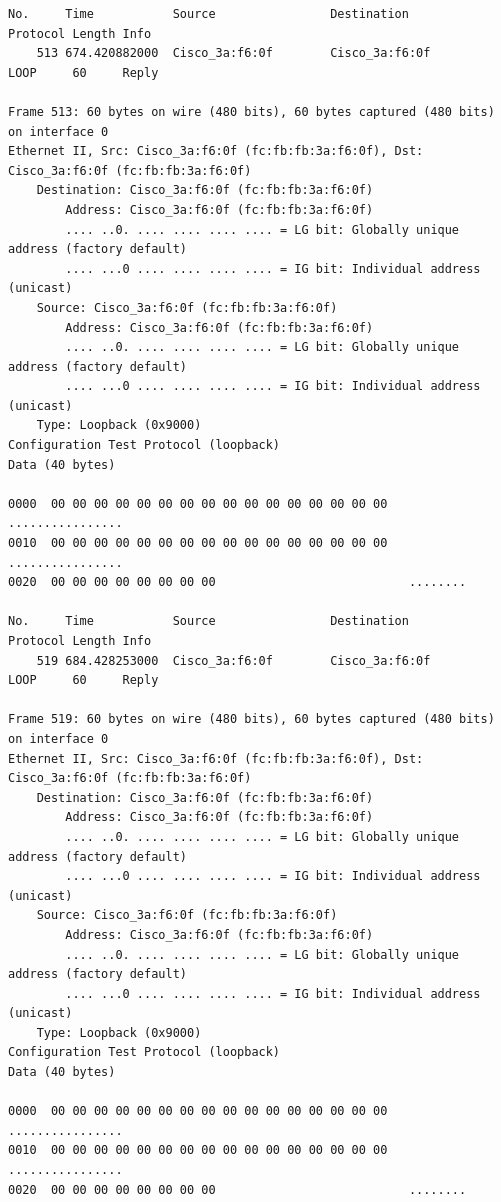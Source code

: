 \documentclass[a4paper,11pt]{article}
\begin{document}
\begin{lstlisting}
No.     Time           Source                Destination           Protocol Length Info
    513 674.420882000  Cisco_3a:f6:0f        Cisco_3a:f6:0f        LOOP     60     Reply

Frame 513: 60 bytes on wire (480 bits), 60 bytes captured (480 bits) on interface 0
Ethernet II, Src: Cisco_3a:f6:0f (fc:fb:fb:3a:f6:0f), Dst: Cisco_3a:f6:0f (fc:fb:fb:3a:f6:0f)
    Destination: Cisco_3a:f6:0f (fc:fb:fb:3a:f6:0f)
        Address: Cisco_3a:f6:0f (fc:fb:fb:3a:f6:0f)
        .... ..0. .... .... .... .... = LG bit: Globally unique address (factory default)
        .... ...0 .... .... .... .... = IG bit: Individual address (unicast)
    Source: Cisco_3a:f6:0f (fc:fb:fb:3a:f6:0f)
        Address: Cisco_3a:f6:0f (fc:fb:fb:3a:f6:0f)
        .... ..0. .... .... .... .... = LG bit: Globally unique address (factory default)
        .... ...0 .... .... .... .... = IG bit: Individual address (unicast)
    Type: Loopback (0x9000)
Configuration Test Protocol (loopback)
Data (40 bytes)

0000  00 00 00 00 00 00 00 00 00 00 00 00 00 00 00 00   ................
0010  00 00 00 00 00 00 00 00 00 00 00 00 00 00 00 00   ................
0020  00 00 00 00 00 00 00 00                           ........

No.     Time           Source                Destination           Protocol Length Info
    519 684.428253000  Cisco_3a:f6:0f        Cisco_3a:f6:0f        LOOP     60     Reply

Frame 519: 60 bytes on wire (480 bits), 60 bytes captured (480 bits) on interface 0
Ethernet II, Src: Cisco_3a:f6:0f (fc:fb:fb:3a:f6:0f), Dst: Cisco_3a:f6:0f (fc:fb:fb:3a:f6:0f)
    Destination: Cisco_3a:f6:0f (fc:fb:fb:3a:f6:0f)
        Address: Cisco_3a:f6:0f (fc:fb:fb:3a:f6:0f)
        .... ..0. .... .... .... .... = LG bit: Globally unique address (factory default)
        .... ...0 .... .... .... .... = IG bit: Individual address (unicast)
    Source: Cisco_3a:f6:0f (fc:fb:fb:3a:f6:0f)
        Address: Cisco_3a:f6:0f (fc:fb:fb:3a:f6:0f)
        .... ..0. .... .... .... .... = LG bit: Globally unique address (factory default)
        .... ...0 .... .... .... .... = IG bit: Individual address (unicast)
    Type: Loopback (0x9000)
Configuration Test Protocol (loopback)
Data (40 bytes)

0000  00 00 00 00 00 00 00 00 00 00 00 00 00 00 00 00   ................
0010  00 00 00 00 00 00 00 00 00 00 00 00 00 00 00 00   ................
0020  00 00 00 00 00 00 00 00                           ........


\end{lstlisting}
\end{document}
